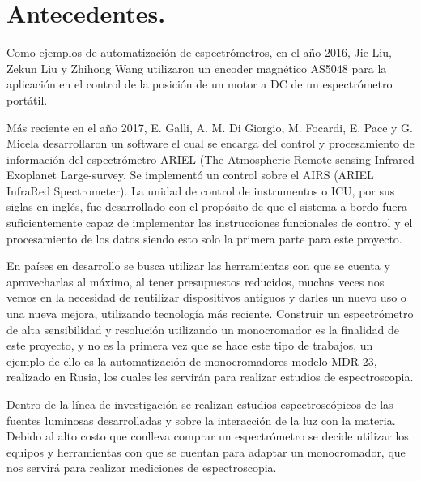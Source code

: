 \section{Antecedentes.}
Como ejemplos de automatización de espectrómetros, en el año 2016, Jie Liu, Zekun Liu y Zhihong Wang utilizaron un encoder magnético AS5048 para la aplicación en el control de la posición de un motor a DC de un espectrómetro portátil. \cite{JieLiu2016}

Más reciente en el año 2017, E. Galli, A. M. Di Giorgio, M. Focardi, E. Pace y G. Micela desarrollaron un software el cual se encarga del control y procesamiento de información del espectrómetro ARIEL (The Atmospheric Remote-sensing Infrared Exoplanet Large-survey. Se implementó un control sobre el AIRS (ARIEL InfraRed Spectrometer). La unidad de control de instrumentos o ICU, por sus siglas en inglés, fue desarrollado con el propósito de que el sistema a bordo fuera suficientemente capaz de implementar las instrucciones funcionales de control y el procesamiento de los datos siendo esto solo la primera parte para este proyecto. \cite{E.GalliA.M.DiGiorgioM.FocardiE.Pace2017}

En países en desarrollo se busca utilizar las herramientas con que se cuenta y aprovecharlas al máximo, al tener presupuestos reducidos, muchas veces nos vemos en la necesidad de reutilizar dispositivos antiguos y darles un nuevo uso o una nueva mejora, utilizando tecnología más reciente. Construir un espectrómetro de alta sensibilidad y resolución utilizando un monocromador es la finalidad de este proyecto, y no es la primera vez que se hace este tipo de trabajos, un ejemplo de ello es la automatización de monocromadores modelo MDR-23, realizado en Rusia, los cuales les servirán para realizar estudios de espectroscopia. \cite{Kraminin2015}

Dentro de la línea de investigación se realizan estudios espectroscópicos de las fuentes luminosas desarrolladas y sobre la interacción de la luz con la materia. Debido al alto costo que conlleva comprar un espectrómetro se decide utilizar los equipos y herramientas con que se cuentan para adaptar un monocromador, que nos servirá para realizar mediciones de espectroscopia.





